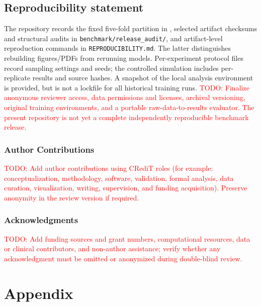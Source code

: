 \documentclass{article} %
\newcommand{\todo}[1]{\textcolor{red}{TODO: #1}}
\begin{document}
\subsection*{Reproducibility statement}

The repository records the fixed five-fold partition in
, selected artifact checksums and
structural audits in \texttt{benchmark/release\_audit/}, and artifact-level
reproduction commands in \texttt{REPRODUCIBILITY.md}. The latter distinguishes
rebuilding figures/PDFs from rerunning models. Per-experiment protocol files
record sampling settings and seeds; the controlled simulation includes
per-replicate results and source hashes. A snapshot of the local analysis
environment is provided, but is not a lockfile for all historical training runs.
\todo{Finalize anonymous reviewer access, data permissions and licenses,
archival versioning, original training environments, and a portable
raw-data-to-results evaluator. The present repository is not yet a complete
independently reproducible benchmark release.}

\subsubsection*{Author Contributions}

\noindent\todo{Add author contributions using CRediT roles (for example: conceptualization, methodology, software, validation, formal analysis, data curation, visualization, writing, supervision, and funding acquisition). Preserve anonymity in the review version if required.}

\subsubsection*{Acknowledgments}

\noindent\todo{Add funding sources and grant numbers, computational resources, data or clinical contributors, and non-author assistance; verify whether any acknowledgment must be omitted or anonymized during double-blind review.}




\appendix
\section{Appendix}


\end{document}
